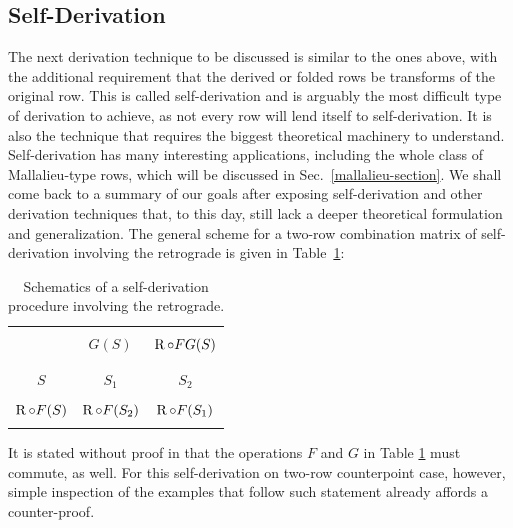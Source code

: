 \subsection{Self-Derivation}

The next derivation technique to be discussed is similar to the ones above, with the additional requirement that the derived or folded rows be transforms of the original row. This is called self-derivation and is arguably the most difficult type of derivation to achieve, as not every row will lend itself to self-derivation. It is also the technique that requires the biggest theoretical machinery to understand. Self-derivation has many interesting applications, including the whole class of Mallalieu-type rows, which will be discussed in Sec.~\ref{mallalieu-section}. We shall come back to a summary of our goals after exposing self-derivation and other derivation techniques that, to this day, still lack a deeper theoretical formulation and generalization. The general scheme for a two-row combination matrix of self-derivation involving the retrograde is given in Table~\ref{derivation-self}:

\begin{table}[htbp]
    \caption[Self-Derivation Involving the Retrograde]{Schematics of a self-derivation procedure involving the retrograde.}
    \label{derivation-self}
    \centering
    \vspace{12pt}
    \begin{tabular}{c|cc}
        \hline\\
        & $G(S)$ & $\operatorname{R} \circ FG(S)$ \\\\
        \hline\\
        $S$ & $S_1$ & $S_2$ \\\\
        $\operatorname{R} \circ F(S)$ & $\operatorname{R} \circ F(S_2)$ & $\operatorname{R} \circ F(S_1)$ \\\\
        \hline
    \end{tabular}
\end{table}

It is stated without proof in \cite[217]{Starr1984} that the operations $F$ and $G$ in Table \ref{derivation-self} must commute, as well. For this self-derivation on two-row counterpoint case, however, simple inspection of the examples that follow such statement already affords a counter-proof.

